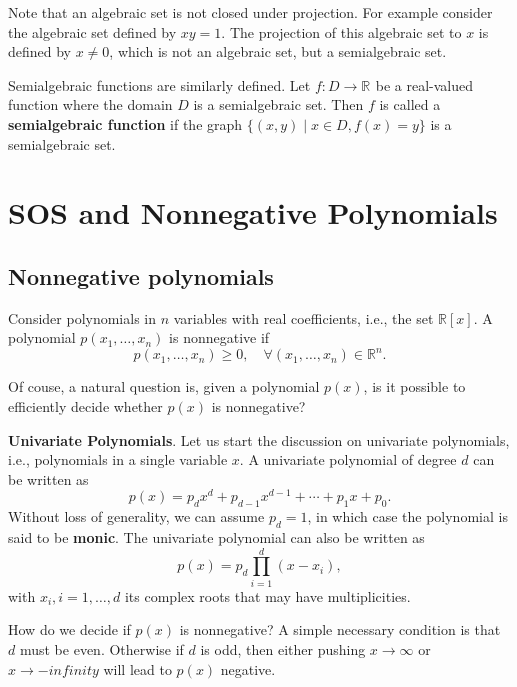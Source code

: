 \documentclass[
]{book}
\theoremstyle{definition}
\theoremstyle{definition}
\theoremstyle{definition}
\theoremstyle{definition}
\theoremstyle{remark}
\begin{document}
Note that an algebraic set is not closed under projection. For example consider the algebraic set defined by \(xy = 1\). The projection of this algebraic set to \(x\) is defined by \(x \neq 0\), which is not an algebraic set, but a semialgebraic set.

Semialgebraic functions are similarly defined. Let \(f: D \rightarrow \mathbb{R}^{}\) be a real-valued function where the domain \(D\) is a semialgebraic set. Then \(f\) is called a \textbf{semialgebraic function} if the graph \(\{ (x,y) \mid x \in D, f(x)=y \}\) is a semialgebraic set.

\section{SOS and Nonnegative Polynomials}\label{sos-and-nonnegative-polynomials}

\subsection{Nonnegative polynomials}\label{nonnegative-polynomials}

Consider polynomials in \(n\) variables with real coefficients, i.e., the set \(\mathbb{R}[x]\). A polynomial \(p(x_1,\dots,x_n)\) is nonnegative if
\[
p(x_1,\dots,x_n) \geq 0, \quad \forall (x_1,\dots,x_n) \in \mathbb{R}^{n}.
\]

Of couse, a natural question is, given a polynomial \(p(x)\), is it possible to efficiently decide whether \(p(x)\) is nonnegative?

\textbf{Univariate Polynomials}. Let us start the discussion on univariate polynomials, i.e., polynomials in a single variable \(x\). A univariate polynomial of degree \(d\) can be written as
\begin{equation}
p(x) = p_d x^d + p_{d-1} x^{d-1} + \cdots + p_1 x + p_0.
\label{eq:univariate-poly}
\end{equation}
Without loss of generality, we can assume \(p_d = 1\), in which case the polynomial is said to be \textbf{monic}. The univariate polynomial can also be written as
\begin{equation}
p(x) = p_d \prod_{i=1}^d (x - x_i),
\label{eq:univariate-poly-root}
\end{equation}
with \(x_i,i=1,\dots,d\) its complex roots that may have multiplicities.

How do we decide if \(p(x)\) is nonnegative? A simple necessary condition is that \(d\) must be even. Otherwise if \(d\) is odd, then either pushing \(x \rightarrow \infty\) or \(x \rightarrow -infinity\) will lead to \(p(x)\) negative.
\end{document}
